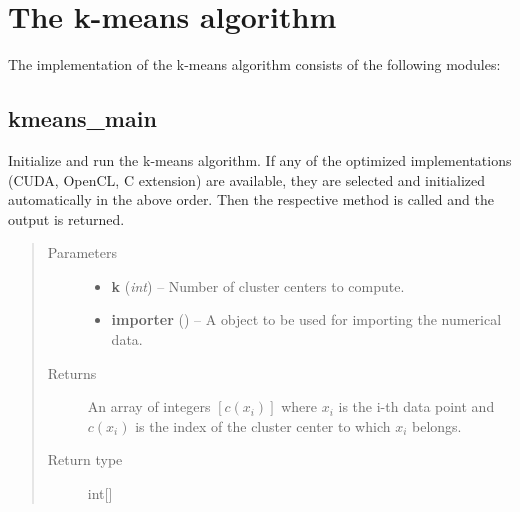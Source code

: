 \documentclass[letterpaper,10pt,english]{sphinxmanual}
\begin{document}
\chapter{The k-means algorithm}
\label{kmeans::doc}\label{kmeans:the-k-means-algorithm}
The implementation of the k-means algorithm consists of the following modules:


\section{kmeans\_main}
\label{kmeans:module-kmeans_main}\label{kmeans:kmeans-main}

\begin{fulllineitems}
\label{kmeans:kmeans_main.kmeans}
Initialize and run the k-means algorithm. If any of the optimized implementations (CUDA, OpenCL, C extension) are
available, they are selected and initialized automatically in the above order. Then the respective
 method is called and the output is returned.
\begin{quote}\begin{description}
\item[{Parameters}] \leavevmode\begin{itemize}
\item {} 
\textbf{k} (\emph{int}) -- Number of cluster centers to compute.

\item {} 
\textbf{importer} ({\hyperref[common:common_data_importer.CommonDataImporter]{}}) -- A {\hyperref[common:common_data_importer.CommonDataImporter]{}} object to be used for importing the numerical data.

\end{itemize}

\item[{Returns}] \leavevmode
An array of integers \([c(x_i)]\) where \(x_i\) is the i-th data point and
\(c(x_i)\) is the index of the cluster center to which \(x_i\) belongs.

\item[{Return type}] \leavevmode
int{[}{]}

\end{description}\end{quote}

\end{fulllineitems}
\end{document}
